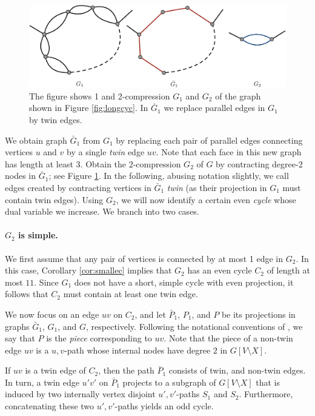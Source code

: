 \documentclass{article}
\newcommand{\0}{\mathbb{0}}
\newcommand{\1}{\mathbb{1}}
\begin{document}
\begin{figure}[ht]
  \begin{center}
    \includegraphics[width=.85\textwidth]{2compress.pdf}
  \end{center}
  \caption{\label{fig:2compress} The figure shows 1 and 2-compression
    $G_1$ and $G_2$ of the graph shown in Figure \ref{fig:longcyc}. In $\bar{G}_1$ we replace parallel
    edges in $G_1$ by twin edges. }
\end{figure}

We obtain graph $\bar{G}_1$ from $G_1$ by replacing each pair of parallel edges
connecting vertices $u$ and $v$ by a single {\em twin} edge $uv$.
Note that each face in this new graph has length at least 3.
Obtain the 2-compression $G_2$ of
$G$ by contracting degree-2 nodes in $\bar{G}_1$; see Figure
\ref{fig:2compress}. In the following, abusing notation slightly, we
call edges created by contracting vertices in $\bar{G}_1$ {\em
twin} (as their projection in $G_1$ must contain twin edges). Using $G_2$, we will now
identify a certain even {\em cycle} whose dual variable we increase. 
We branch into two
cases. 

\paragraph{$G_2$ is simple.}

We first assume that any pair of vertices is connected by at most 1 edge in $G_2$. 
In this case, Corollary \ref{cor:smallec} implies that $G_2$ has an even cycle $C_2$ 
of length at most $11$. Since $G_1$ does not have a short, simple cycle with even
projection, it follows that $C_2$ must contain at least one twin edge.

We now focus on an edge $uv$ on $C_2$, and let $\bar{P}_1$, $P_1$, and $P$
be its projections in graphs $\bar{G}_1$, $G_1$, and $G$, respectively.  
Following the notational conventions of 
\cite{FJP10}, we say that $P$ is the {\em piece} corresponding to $uv$. 
Note that the piece of a non-twin edge $uv$ is a $u,v$-path whose
internal nodes have degree $2$ in $G[V\setminus X]$.

If $uv$ is a twin edge of $C_2$, then the path $\bar{P}_1$ consists of twin, and non-twin
edges. In turn, a twin edge $u'v'$ on $\bar{P}_1$ projects to a
subgraph of $G[V \setminus X]$ that is induced by two internally vertex
disjoint $u',v'$-paths $S_1$ and $S_2$. Furthermore, concatenating these two
$u',v'$-paths yields an odd cycle. 
\end{document}
